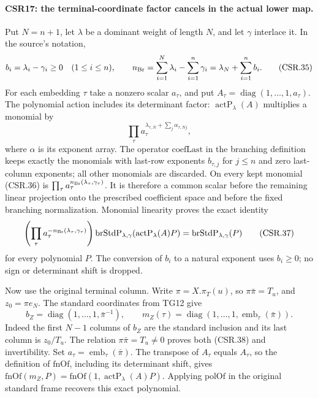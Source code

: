 \paragraph{CSR17: the terminal-coordinate factor cancels in the actual lower map.}
\label{claim:CSR17}
Put \(N=n+1\), let \(\lambda\) be a dominant weight of length
\(N\), and let \(\gamma\) interlace it. In the source's notation,
\[
 b_i=\lambda_i-\gamma_i\geq0\quad(1\leq i\leq n),\qquad
 n_{\rm Br}=\sum_{i=1}^{N}\lambda_i-\sum_{i=1}^{n}\gamma_i
       =\lambda_N+\sum_{i=1}^{n}b_i .
 \tag{CSR.35}
\]
For each embedding \(\tau\) take a nonzero scalar \(a_\tau\),
and put \(A_\tau=\operatorname{diag}(1,\ldots,1,a_\tau)\).
The polynomial action includes its determinant factor:
\(\operatorname{actP}_{\lambda}(A)\) multiplies a monomial by
\[
 \prod_\tau a_\tau^{\lambda_{\tau,N}
                 +\sum_j \alpha_{\tau,Nj}},
 \tag{CSR.36}
\]
where \(\alpha\) is its exponent array. The operator
\(\mathrm{coefLast}\) in the branching definition keeps exactly
the monomials with last-row exponents \(b_{\tau,j}\) for
\(j\leq n\) and zero last-column exponents; all other monomials
are discarded. On every kept monomial (CSR.36) is
\(\prod_\tau a_\tau^{n_{\rm Br}(\lambda_\tau,\gamma_\tau)}\).
It is therefore a common scalar before the remaining linear
projection onto the prescribed coefficient space and before
the fixed branching normalization. Monomial linearity proves
the exact identity
\[
 \left(\prod_\tau
 a_\tau^{-n_{\rm Br}(\lambda_\tau,\gamma_\tau)}\right)
 \operatorname{brStdP}_{\lambda,\gamma}
       (\operatorname{actP}_{\lambda}(A)P)
   =\operatorname{brStdP}_{\lambda,\gamma}(P)
 \tag{CSR.37}
\]
for every polynomial \(P\). The conversion of \(b_i\) to a
natural exponent uses \(b_i\geq0\); no sign or determinant
shift is dropped.

Now use the original terminal column. Write
\(\pi=X.\pi_T(u)\), so \(\pi\bar\pi=T_u\), and
\(z_0=\pi e_N\). The standard coordinates from TG12 give
\[
 b_Z=\operatorname{diag}(1,\ldots,1,\bar\pi^{-1}),\qquad
 m_Z(\tau)=\operatorname{diag}
      (1,\ldots,1,\operatorname{emb}_{\tau}(\bar\pi)).
 \tag{CSR.38}
\]
Indeed the first \(N-1\) columns of \(b_Z\) are the standard
inclusion and its last column is \(z_0/T_u\). The relation
\(\pi\bar\pi=T_u\neq0\) proves both (CSR.38) and invertibility.
Set \(a_\tau=\operatorname{emb}_{\tau}(\bar\pi)\).
The transpose of \(A_\tau\) equals \(A_\tau\), so the
definition of \(\mathrm{fnOf}\), including its determinant
shift, gives
\(\mathrm{fnOf}(m_Z,P)=
\mathrm{fnOf}(1,\operatorname{actP}_{\lambda}(A)P)\).
Applying \(\mathrm{polOf}\) in the original standard frame
recovers this exact polynomial.

